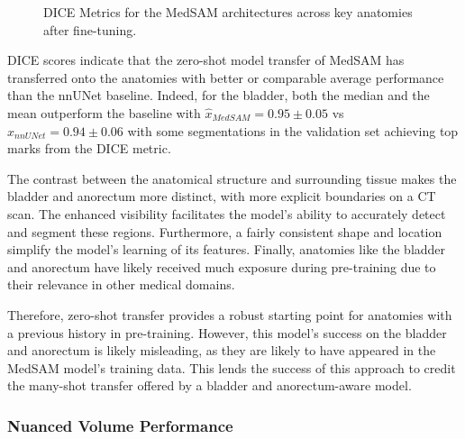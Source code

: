 \documentclass[11pt,twoside]{report}
\begin{document}
\begin{figure}[H]
  \centering
  \vspace*{1em}
  \caption{DICE Metrics for the MedSAM architectures across key anatomies after fine-tuning.}\label{fig:medsam-finetune-dice}
\end{figure}

DICE scores indicate that the zero-shot model transfer of MedSAM has transferred onto the anatomies with better or comparable average performance than the nnUNet baseline. Indeed, for the bladder, both the median and the mean outperform the baseline with $\hat{x}_{MedSAM} = 0.95 \pm 0.05$ vs $\hat{x}_{nnUNet} = 0.94 \pm 0.06$ with some segmentations in the validation set achieving top marks from the DICE metric. 

The contrast between the anatomical structure and surrounding tissue makes the bladder and anorectum more distinct, with more explicit boundaries on a CT scan. The enhanced visibility facilitates the model's ability to accurately detect and segment these regions. Furthermore, a fairly consistent shape and location simplify the model's learning of its features. Finally, anatomies like the bladder and anorectum have likely received much exposure during pre-training due to their relevance in other medical domains.

Therefore, zero-shot transfer provides a robust starting point for anatomies with a previous history in pre-training. However, this model's success on the bladder and anorectum is likely misleading, as they are likely to have appeared in the MedSAM model's training data. This lends the success of this approach to credit the many-shot transfer offered by a bladder and anorectum-aware model.

\subsubsection{Nuanced Volume Performance}
\end{document}
